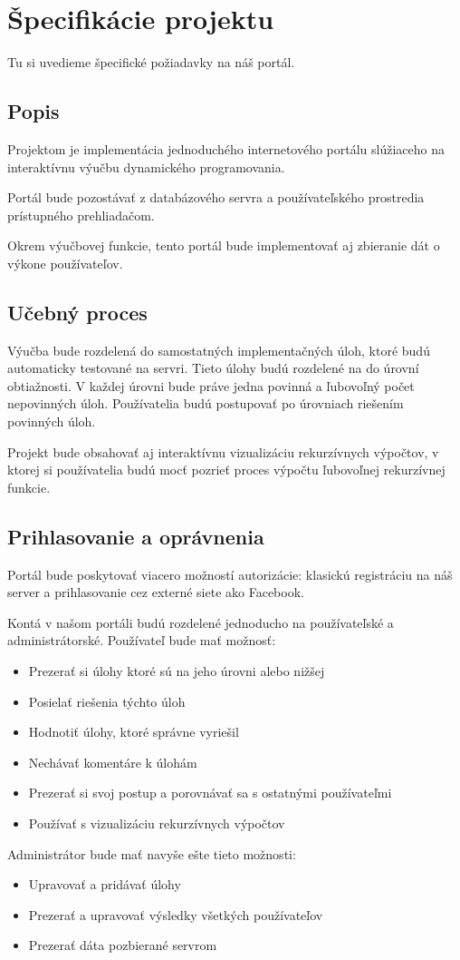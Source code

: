 \chapter{Špecifikácie projektu}
Tu si uvedieme špecifické požiadavky na náš portál.

\section{Popis}
Projektom je implementácia jednoduchého internetového portálu slúžiaceho na interaktívnu výučbu
dynamického programovania.

Portál bude pozostávať z databázového servra a používateľského prostredia
prístupného prehliadačom.

Okrem výučbovej funkcie, tento portál bude implementovať aj zbieranie dát
o výkone používateľov.
\section{Učebný proces}
Výučba bude rozdelená do samostatných implementačných úloh, ktoré budú automaticky
testované na servri. Tieto úlohy budú rozdelené na do úrovní obtiažnosti.
V každej úrovni bude práve jedna povinná a ľubovoľný počet nepovinných úloh.
Používatelia budú postupovať po úrovniach riešením povinných úloh.

Projekt bude obsahovať aj interaktívnu vizualizáciu rekurzívnych výpočtov,
v ktorej si používatelia budú mocť pozrieť proces výpočtu ľubovoľnej rekurzívnej funkcie.

\section{Prihlasovanie a oprávnenia}
Portál bude poskytovať viacero možností autorizácie: klasickú registráciu
na náš server a prihlasovanie cez externé siete ako Facebook.

Kontá v našom portáli budú rozdelené jednoducho na používateľské a administrátorské.
\newpage
Používateľ bude mať možnosť:
\begin{itemize}
  \item Prezerať si úlohy ktoré sú na jeho úrovni alebo nižšej
  \item Posielať riešenia týchto úloh
  \item Hodnotiť úlohy, ktoré správne vyriešil
  \item Nechávať komentáre k úlohám
  \item Prezerať si svoj postup a porovnávať sa s ostatnými používateľmi
  \item Používať s vizualizáciu rekurzívnych výpočtov
\end{itemize}
Administrátor bude mať navyše ešte tieto možnosti:
\begin{itemize}
  \item Upravovať a pridávať úlohy
  \item Prezerať a upravovať výsledky všetkých používateľov
  \item Prezerať dáta pozbierané servrom
\end{itemize}
